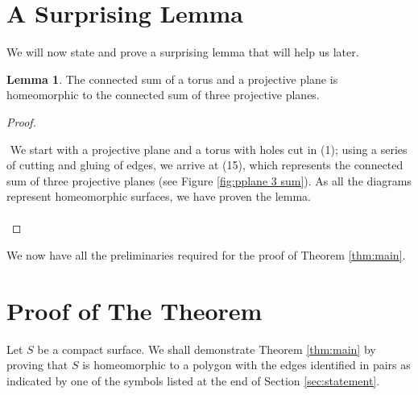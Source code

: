 \documentclass{article}
\theoremstyle{definition}
\newtheorem{lem}[theorem]{Lemma}
\begin{document}
\section{A Surprising Lemma}
%
We will now state and prove a surprising lemma that will help us later.
\begin{lem}\label{lem:surprise}
  The connected sum of a torus and a projective plane is homeomorphic to the connected sum of three projective planes.
\end{lem}
\begin{proof}
$ $\newline
\begin{adjustwidth}{-20mm}{-20mm}
  \begin{center}
    
    

    
    
    

    
    
    
  \end{center}

  
  
  

  
  
  

  \begin{center}
    
  \end{center}
\end{adjustwidth}
$ $\newline
We start with a projective plane and a torus with holes cut in (1); using a series of cutting and gluing of edges, we arrive at (15), which represents the connected sum of three projective planes (see Figure \ref{fig:pplane 3 sum}). As all the diagrams represent homeomorphic surfaces, we have proven the lemma.\\~\\
\end{proof}
We now have all the preliminaries required for the proof of Theorem \ref{thm:main}.
%
\newpage
\section{Proof of The Theorem}
%
Let $S$ be a compact surface. We shall demonstrate Theorem \ref{thm:main} by proving that $S$ is homeomorphic to a polygon with the edges identified in pairs as indicated by one of the symbols listed at the end of Section \ref{sec:statement}.\\
\end{document}
